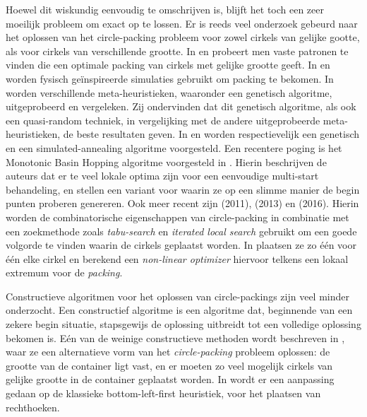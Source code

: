\documentclass[12pt,a4paper,oneside]{book}
\begin{document}
Hoewel dit wiskundig eenvoudig te omschrijven is, blijft het toch een zeer moeilijk probleem om exact op te lossen.
Er is reeds veel onderzoek gebeurd naar het oplossen van het circle-packing probleem voor zowel cirkels van gelijke gootte, als voor cirkels van verschillende grootte.
In \cite{graham1996repeated} en \cite{lubachevsky1997curved} probeert men vaste patronen te vinden die een optimale packing van cirkels met gelijke grootte geeft.
In \cite{graham1998dense} en \cite{wang2002improved} worden fysisch geïnspireerde simulaties gebruikt om packing te bekomen.
In \cite{george1995packing} worden verschillende meta-heuristieken, waaronder een genetisch algoritme, uitgeprobeerd en vergeleken.
Zij ondervinden dat dit genetisch algoritme, als ook een quasi-random techniek, in vergelijking met de andere uitgeprobeerde meta-heuristieken, de beste resultaten geven.
In \cite{hifi2004approximate} en \cite{hifi2004simulated} worden respectievelijk een genetisch en een simulated-annealing algoritme voorgesteld.
Een recentere poging is het Monotonic Basin Hopping algoritme voorgesteld in \cite{grosso2010}.
Hierin beschrijven de auteurs dat er te veel lokale optima zijn voor een eenvoudige multi-start behandeling, en stellen een variant voor waarin ze op een slimme manier de begin punten proberen genereren.
Ook meer recent zijn \cite{jors2011} (2011), \cite{ye2013iterated} (2013) en \cite{zeng2016iterated} (2016).
Hierin worden de combinatorische eigenschappen van circle-packing in combinatie met een zoekmethode zoals \textit{tabu-search} en \textit{iterated local search} gebruikt om een goede volgorde te vinden waarin de cirkels geplaatst worden.
In \cite{jors2011} plaatsen ze zo één voor één elke cirkel en berekend een \textit{non-linear optimizer} hiervoor telkens een lokaal extremum voor de \textit{packing}.

Constructieve algoritmen voor het oplossen van circle-packings zijn veel minder onderzocht.
Een constructief algoritme is een algoritme dat, beginnende van een zekere begin situatie, stapsgewijs de oplossing uitbreidt tot een volledige oplossing bekomen is.
Eén van de weinige constructieve methoden wordt beschreven in \cite{akeb2006basic}, waar ze een alternatieve vorm van het \textit{circle-packing} probleem oplossen: de grootte van de container ligt vast, en er moeten zo veel mogelijk cirkels van gelijke grootte in de container geplaatst worden.
In \cite{hifi2004approximate} wordt er een aanpassing gedaan op de klassieke bottom-left-first heuristiek, voor het plaatsen van rechthoeken.
\end{document}
